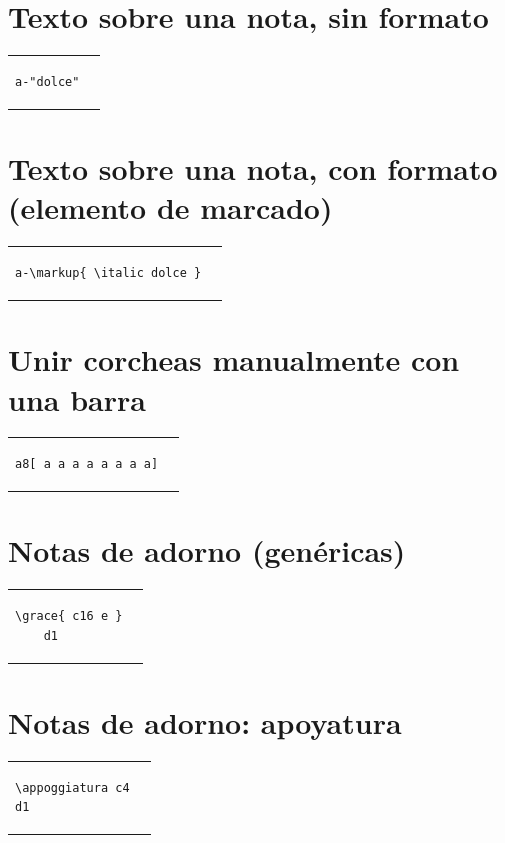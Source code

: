 \documentclass[a4paper,10pt,oneside,headinclude,titlepage]{article} %
\begin{document}
\section*{Texto sobre una nota, sin formato}
\begin{tabular}{m{3cm}m{2cm}}
\begin{verbatim}
a-"dolce"
\end{verbatim}
&
\begin[fragment,notime]{lilypond}
a-"dolce"
\end{lilypond}
\end{tabular}

\section*{Texto sobre una nota, con formato (elemento de marcado)}
\begin{tabular}{m{6cm}m{2cm}}
\begin{verbatim}
a-\markup{ \italic dolce }
\end{verbatim}
&
\begin[fragment,notime]{lilypond}
a-\markup{ \italic dolce }
\end{lilypond}
\end{tabular}

\section*{Unir corcheas manualmente con una barra}
\begin{tabular}{m{6cm}m{2cm}}
\begin{verbatim}
a8[ a a a a a a a a]
\end{verbatim}
&
\begin[fragment]{lilypond}
a8[ a a a a a a a a]
\end{lilypond}
\end{tabular}

\section*{Notas de adorno (genéricas)}
\begin{tabular}{m{6cm}m{2cm}}
\begin{verbatim}
\grace{ c16 e }
    d1
\end{verbatim}
&
\begin[fragment,relative=1]{lilypond}
\grace{ c16 e }
    d1
\end{lilypond}
\end{tabular}

\section*{Notas de adorno: apoyatura}
\begin{tabular}{m{6cm}m{2cm}}
\begin{verbatim}
\appoggiatura c4
d1
\end{verbatim}
&
\begin[fragment,relative=1]{lilypond}
\appoggiatura c4
d1
\end{lilypond}
\end{tabular}
\end{document}
